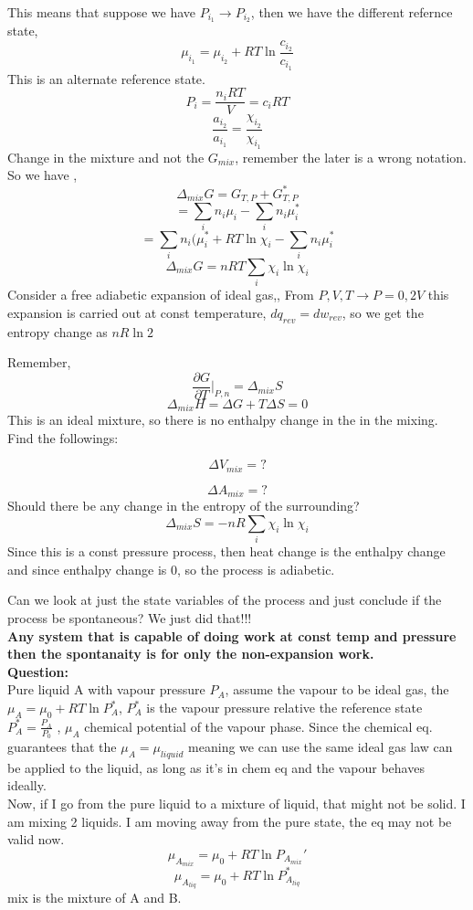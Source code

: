 \documentclass{article}
\theoremstyle{definition}
\begin{document}
\\
This means that suppose we have $P_{i_1} \rightarrow P_{i_2}$, then we have the different refernce state,
\[
\mu_{i_1}  = \mu_{i_2} + RT\ln{\frac{c_{i_2}}{c_{i_1}}}
\]
This is an alternate reference state.
\[
P_i = \frac{n_iRT}{V} = c_iRT
\]
\[
\frac{a_{i_2}}{a_{i_1}} = \frac{\chi_{i_2}}{\chi_{i_1}}
\]
Change in the mixture and not the $G_{mix}$, remember the later is a wrong notation.
So we have ,
\[
\Delta_{mix} G = G_{T,P} +  G_{T,P}^*

\]
\[
= \sum_i n_i\mu_i - \sum_in_i\mu_i^*
\]
\[
= \sum_i n_i(\mu_i^* + RT\ln{\chi_i} - \sum_in_i\mu_i^*
\]
\[
 \Delta_{mix} G = nRT\sum_i \chi_i\ln{\chi_i}
\]
Consider a free adiabetic expansion of ideal gas,,
From $P,V,T \rightarrow P=0, 2V$ this expansion is carried out at const temperature, $dq_{rev} = dw_{rev}$, so we get the entropy change as $nR\ln{2}$

Remember,
\[
\frac{\partial G}{\partial T}|_{P,n} = \Delta_{mix} S
\]
\[
\Delta_{mix} H = \Delta G + T\Delta S = 0
\]
This is an ideal mixture, so there is no enthalpy change in the in the mixing.\\
Find the followings:

\[
\Delta V_{mix} = ?
\]

\[
\Delta A_{mix } = ?
\]
Should there be any change in the entropy of the surrounding? 
\[
\Delta_{mix} S = -nR\sum_i \chi_i\ln{\chi_i}
\]
Since this is a const pressure process, then heat change is the enthalpy change and since enthalpy change is 0, so the process is adiabetic.

Can we look at just the state variables of the process and just conclude if the process be spontaneous?
We just did that!!!\\
\textbf{
Any system that is capable of doing work at const temp and pressure then the spontanaity is for only the non-expansion work.
}\\
\textbf{Question:}
\\
Pure liquid A with vapour pressure $P_A$, assume the vapour to be ideal gas, the $\mu_A = \mu_0 + RT\ln{P_A^*}$, $P_A^*$ is the vapour pressure relative the reference state $P_A^* = \frac{P_A}{P_0}$ , $\mu_A$ chemical potential of the vapour phase. Since the chemical eq. guarantees that the $\mu_A = \mu_{liquid}$ meaning we can use the same ideal gas law can be applied to the liquid, as long as it's in chem eq and the vapour behaves ideally.
\\
Now, if I go from the pure liquid to a mixture of liquid, that might not be solid. I am mixing 2 liquids. I am moving away from the pure state, the eq may not be valid now. 
\[
\mu_{A_{mix}} = \mu_0  + RT\ln{P_{A_{mix}}'}
\]
\[
\mu_{A_{liq}} = \mu_0  + RT\ln{P_{A_{liq}}^*}
\]
mix is the mixture of A and B. 
\end{document}
